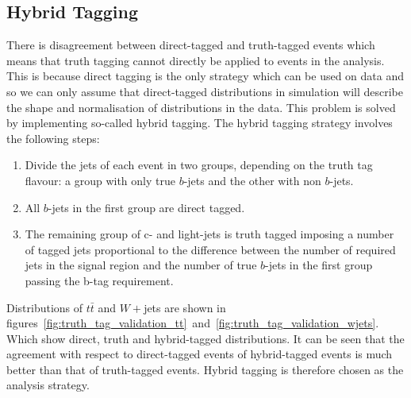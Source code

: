\subsection{Hybrid Tagging}
\label{subsec:hybrid-tagging}
There is disagreement between direct-tagged and truth-tagged events which
means that truth tagging cannot directly be applied to events in the analysis.
This is because direct tagging is the only strategy which can be used on data
and so we can only assume that direct-tagged distributions in simulation will
describe the shape and normalisation of distributions in the data. This problem
is solved by implementing so-called hybrid tagging. The hybrid tagging strategy
involves the following steps:
\begin{enumerate}
\item Divide the jets of each event in two groups, depending on the truth tag
  flavour: a group with only true $b$-jets and the other with non $b$-jets.
  
\item All $b$-jets in the first group are direct tagged.
  
\item  The remaining group of c- and light-jets is truth tagged imposing a
  number of tagged jets proportional to the difference between the number of
  required jets in the signal region and the number of true $b$-jets in the first
  group passing the b-tag requirement.
\end{enumerate}
Distributions of $t\bar{t}$ and $W+$jets are shown in
figures~\ref{fig:truth_tag_validation_tt}~and~\ref{fig:truth_tag_validation_wjets}.
Which show direct, truth and hybrid-tagged distributions. It can be seen that
the agreement with respect to direct-tagged events of hybrid-tagged events is
much better than that of truth-tagged events. Hybrid tagging is therefore chosen
as the analysis strategy.


\clearpage
\newpage
